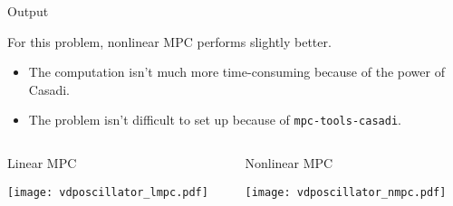 \documentclass[xcolor=dvipsnames]{beamer}
\begin{document}
\begin{frame}{Output}

For this problem, nonlinear MPC performs slightly better.
\begin{itemize}
    \item The computation isn't much more time-consuming because of the power of Casadi.
    \item The problem isn't difficult to set up because of \texttt{mpc-tools-casadi}.
\end{itemize}
    
\begin{columns}
    \begin{column}{.475\textwidth}
        \begin{block}{Linear MPC}
            \begin{center}
                \texttt{[image: vdposcillator\_lmpc.pdf]}
            \end{center}
        \end{block}
    \end{column}
    \begin{column}{.475\textwidth}
        \begin{block}{Nonlinear MPC}
            \begin{center}
                \texttt{[image: vdposcillator\_nmpc.pdf]}
            \end{center}
        \end{block}
    \end{column}
\end{columns}
\end{frame}
\end{document}
